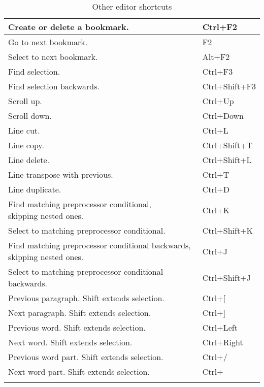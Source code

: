 {\begin{longtable}{|l|l|}
Create or delete a bookmark. 	            &   Ctrl+F2                 \\ \hline
Go to next bookmark. 	                    &   F2                      \\ \hline
Select to next bookmark. 	                &   Alt+F2                  \\ \hline
Find selection. 	                        &   Ctrl+F3                 \\ \hline
Find selection backwards. 	                &   Ctrl+Shift+F3           \\ \hline
Scroll up. 	                                &   Ctrl+Up                 \\ \hline
Scroll down. 	                            &   Ctrl+Down               \\ \hline
Line cut. 	                                &   Ctrl+L                  \\ \hline
Line copy. 	                                &   Ctrl+Shift+T            \\ \hline
Line delete. 	                            &   Ctrl+Shift+L            \\ \hline
Line transpose with previous. 	            &   Ctrl+T                  \\ \hline
Line duplicate. 	                        &   Ctrl+D                  \\ \hline
\makecell[l]{Find matching preprocessor conditional, \\
skipping nested ones.} 	                    &   Ctrl+K                  \\ \hline
Select to matching preprocessor conditional.&   Ctrl+Shift+K            \\ \hline
\makecell[l]{Find matching preprocessor conditional backwards, \\
skipping nested ones.} 	                    &   Ctrl+J                  \\ \hline
Select to matching preprocessor conditional backwards. 	&   Ctrl+Shift+J\\ \hline
Previous paragraph. Shift extends selection.&   Ctrl+[                  \\ \hline
Next paragraph. Shift extends selection. 	&   Ctrl+]                  \\ \hline
Previous word. Shift extends selection. 	&   Ctrl+Left               \\ \hline
Next word. Shift extends selection. 	    &   Ctrl+Right              \\ \hline
Previous word part. Shift extends selection.&   Ctrl+/                  \\ \hline
Next word part. Shift extends selection. 	&   Ctrl+\osp               \\ \hline
\caption{Other editor shortcuts}
\end{longtable}
}

